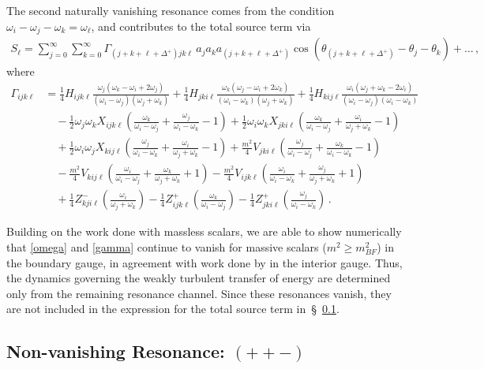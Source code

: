 \documentclass[letterpaper,11pt]{article}
\newcommand{\oi}{\omega_i}
\newcommand{\oj}{\omega_j}
\newcommand{\ok}{\omega_k}
\newcommand{\ol}{\omega_\ell}
\newcommand{\thj}{\theta_j}
\newcommand{\thk}{\theta_k}
\begin{document}
The second naturally vanishing resonance comes from the condition $\oi - \oj - \ok = \ol$, and contributes to the total source term via
\begin{align}
S_\ell = \sum_{j=0}^\infty \sum_{k=0}^\infty \Gamma_{(j + k + \ell + \Delta^+) jk\ell} \, a_j a_k a_{(j+k+\ell + \Delta^+)} \cos \left( \theta_{(j+k+\ell + \Delta^+)} - \thj - \thk \right) + \ldots \, ,
\end{align}
where
\begin{align}
\label{gamma}
\Gamma_{ijk\ell} &= \frac{1}{4} H_{ijk\ell} \frac{\oj (\ok - \oi + 2\oj)}{(\oi - \oj)(\oj + \ok)} + \frac{1}{4} H_{jki\ell} \frac{\ok (\oj - \oi + 2\ok)}{(\oi - \ok)(\oj + \ok)} + \frac{1}{4} H_{kij\ell} \frac{\oi (\oj + \ok - 2\oi)}{(\oi - \oj)(\oi - \ok)} \nonumber \\
% 
& \quad -\frac{1}{2} \oj \ok X_{ijk\ell} \left( \frac{\ok}{\oi - \oj} + \frac{\oj}{\oi - \ok} - 1\right) + \frac{1}{2} \oi \ok X_{jki\ell} \left( \frac{\ok}{\oi - \oj} + \frac{\oi}{\oj + \ok} - 1 \right) \nonumber \\
%
& \quad + \frac{1}{2} \oi \oj X_{kij\ell} \left( \frac{\oj}{\oi - \ok} + \frac{\oi}{\oj + \ok} -1 \right) + \frac{m^2}{4} V_{jki\ell} \left( \frac{\oj}{\oi - \oj} + \frac{\ok}{\oi - \ok} -1\right) \nonumber \\
%
& \quad - \frac{m^2}{4} V_{kij\ell} \left( \frac{\oi}{\oi - \oj} + \frac{\ok}{\oj + \ok} + 1\right) - \frac{m^2}{4} V_{ijk\ell} \left( \frac{\oi}{\oi - \ok} + \frac{\oj}{\oj + \ok} + 1 \right) \nonumber \\
%
& \quad + \frac{1}{4} Z^-_{kji\ell} \left( \frac{\oi}{\oj + \ok}\right) - \frac{1}{4} Z^+_{ijk\ell} \left( \frac{\ok}{\oi - \oj} \right) - \frac{1}{4} Z^+_{jki\ell} \left( \frac{\oj}{\oi - \ok}\right) \, .
\end{align}

Building on the work done with massless scalars, we are able to show numerically that \eqref{omega} and \eqref{gamma} continue to vanish for massive scalars ($m^2 \geq m^2_{BF}$) in the boundary gauge, in agreement with work done by \cite{1810.04753} in the interior gauge. Thus, the dynamics governing the weakly turbulent transfer of energy are determined only from the remaining resonance channel. Since these resonances vanish, they are not included in the expression for the total source term in~\S\!~\ref{subs: ttf resonances}.


\subsection{Non-vanishing Resonance: $(++-)$}
\label{subs: ttf resonances}
\end{document}
